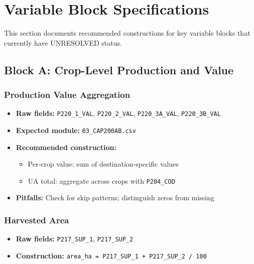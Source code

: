 \documentclass[11pt,a4paper]{article}
\begin{document}
\section{Variable Block Specifications}

This section documents recommended constructions for key variable blocks that currently have UNRESOLVED status.

\subsection{Block A: Crop-Level Production and Value}

\subsubsection{Production Value Aggregation}

\begin{itemize}[leftmargin=1.5em]
    \item \textbf{Raw fields:} \texttt{P220\_1\_VAL}, \texttt{P220\_2\_VAL}, \texttt{P220\_3A\_VAL}, \texttt{P220\_3B\_VAL}
    \item \textbf{Expected module:} \texttt{03\_CAP200AB.csv}
    \item \textbf{Recommended construction:}
    \begin{itemize}
        \item Per-crop value: sum of destination-specific values
        \item UA total: aggregate across crops with \texttt{P204\_COD}
    \end{itemize}
    \item \textbf{Pitfalls:} Check for skip patterns; distinguish zeros from missing
\end{itemize}

\subsubsection{Harvested Area}

\begin{itemize}[leftmargin=1.5em]
    \item \textbf{Raw fields:} \texttt{P217\_SUP\_1}, \texttt{P217\_SUP\_2}
    \item \textbf{Construction:} \texttt{area\_ha = P217\_SUP\_1 + P217\_SUP\_2 / 100}
\end{itemize}
\end{document}
